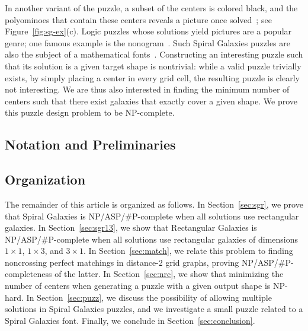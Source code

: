 \documentclass{elsarticle}
\begin{document}
 
In another variant of the puzzle, a subset of the centers is colored black, and the polyominoes that contain these centers reveals a picture once solved~\cite{gsp-18}; see Figure~\ref{fig:sg-ex}(c). Logic puzzles whose solutions yield pictures are a popular genre; one famous example is the nonogram~\cite{ueda96}. Such Spiral Galaxies puzzles are also the subject of a mathematical fonts~\cite{add-sgf-17}. Constructing an interesting puzzle such that its solution is a given target shape is nontrivial: while a valid puzzle trivially exists, by simply placing a center in every grid cell, the resulting puzzle is clearly not interesting.
We are thus also interested in finding the minimum number of centers such that there exist galaxies that exactly cover a given shape. We prove this puzzle design problem to be NP-complete. %
 








\subsection{Notation and Preliminaries}\label{sec:prob}



\subsection{Organization}

The remainder of this article is organized as follows.
In Section~\ref{sec:sgr}, we prove that Spiral Galaxies is NP/ASP/\#P-complete when all solutions use rectangular galaxies.
In Section~\ref{sec:sgr13}, we show that Rectangular Galaxies is NP/ASP/\#P-complete when all solutions use rectangular galaxies of dimensions $1\times1$, $1\times3$, and $3\times1$.
In Section~\ref{sec:match}, we relate this problem to finding noncrossing perfect matchings in distance-2 grid graphs, proving NP/ASP/\#P-completeness of the latter.
In Section~\ref{sec:nrc}, we show that minimizing the number of centers when generating a puzzle with a given output shape is NP-hard.
In Section~\ref{sec:puzz}, we discuss the possibility of allowing multiple solutions in Spiral Galaxies puzzles, and we investigate a small puzzle related to a Spiral Galaxies font.
Finally, we conclude in Section~\ref {sec:conclusion}.
\end{document}
